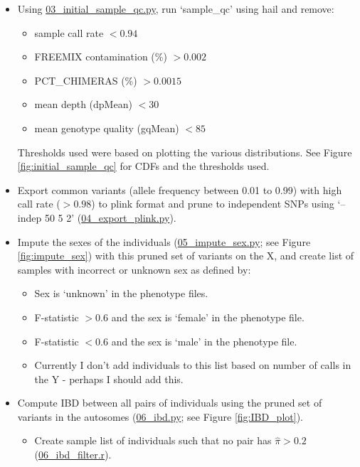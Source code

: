 \documentclass[12pt]{article}
\begin{document}
\begin{itemize}
    \item Using \href{https://github.com/astheeggeggs/BipEx/blob/master/scripts_Dalio/QC_Dalio/03_initial_sample_qc.py}{03\_initial\_sample\_qc.py}, run `sample\_qc' using hail and remove:
    \begin{itemize}
    	\item sample call rate $< 0.94$
    	\item FREEMIX contamination (\%) $> 0.002$
    	\item PCT\_CHIMERAS (\%) $>  0.0015$
    	\item mean depth (dpMean) $< 30$
    	\item mean genotype quality (gqMean) $< 85$
    \end{itemize}
    Thresholds used were based on plotting the various distributions. See Figure \ref{fig:initial_sample_qc} for CDFs and the thresholds used.
    \item Export common variants (allele frequency between 0.01 to 0.99) with high call rate ($>0.98$) to plink format and prune to independent SNPs using `--indep 50 5 2' (\href{https://github.com/astheeggeggs/BipEx/blob/master/scripts_Dalio/QC_Dalio/04_export_plink.py}{04\_export\_plink.py}).
	\item Impute the sexes of the individuals (\href{https://github.com/astheeggeggs/BipEx/blob/master/scripts_Dalio/QC_Dalio/05_impute_sex.py}{05\_impute\_sex.py}; see Figure \ref{fig:impute_sex}) with this pruned set of variants on the X, and create list of samples with incorrect or unknown sex as defined by:
	\begin{itemize}
		\item Sex is `unknown' in the phenotype files.
		\item F-statistic $> 0.6$ and the sex is `female' in the phenotype file.
		\item F-statistic $< 0.6$ and the sex is `male' in the phenotype file.
		\item Currently I don't add individuals to this list based on number of calls in the Y - perhaps I should add this.
	\end{itemize}
	\item Compute IBD between all pairs of individuals using the pruned set of variants in the autosomes (\href{https://github.com/astheeggeggs/BipEx/blob/master/scripts_Dalio/QC_Dalio/06_ibd.py}{06\_ibd.py}; see Figure \ref{fig:IBD_plot}).
		\begin{itemize}
			\item Create sample list of individuals such that no pair has $\hat{\pi}>0.2$ (\href{https://github.com/astheeggeggs/BipEx/blob/master/scripts_Dalio/QC_Dalio/06_ibd_filter.r}{06\_ibd\_filter.r}).

\end{itemize}
\end{itemize}
\end{document}

